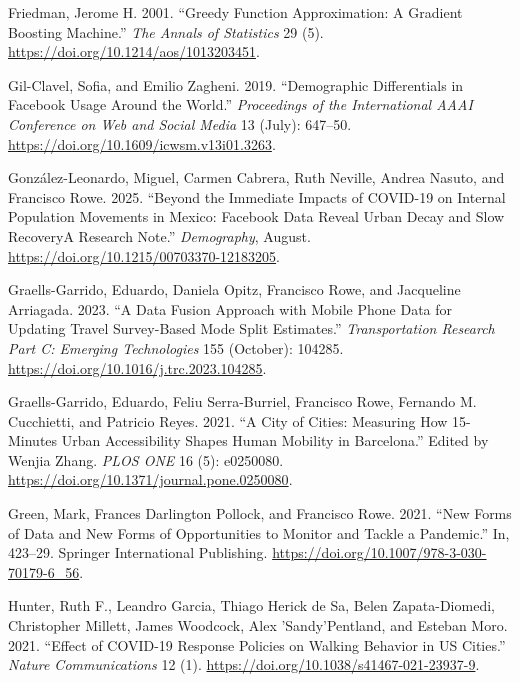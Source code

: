 \documentclass{article}
\newlength{\cslhangindent}
\newenvironment{CSLReferences}[2] %
 {\begin{list}{}{%
  \setlength{\itemindent}{0pt}
  \setlength{\leftmargin}{0pt}
  \setlength{\parsep}{0pt}
  \ifodd #1
   \setlength{\leftmargin}{\cslhangindent}
   \setlength{\itemindent}{-1\cslhangindent}
  \fi
  \setlength{\itemsep}{#2\baselineskip}}}
 {\end{list}}
\begin{document}
\begin{CSLReferences}{1}{0}
Friedman, Jerome H. 2001. {``Greedy Function Approximation: A Gradient Boosting Machine.''} \emph{The Annals of Statistics} 29 (5). \url{https://doi.org/10.1214/aos/1013203451}.

Gil-Clavel, Sofia, and Emilio Zagheni. 2019. {``Demographic Differentials in Facebook Usage Around the World.''} \emph{Proceedings of the International AAAI Conference on Web and Social Media} 13 (July): 647--50. \url{https://doi.org/10.1609/icwsm.v13i01.3263}.

González-Leonardo, Miguel, Carmen Cabrera, Ruth Neville, Andrea Nasuto, and Francisco Rowe. 2025. {``Beyond the Immediate Impacts of COVID-19 on Internal Population Movements in Mexico: Facebook Data Reveal Urban Decay and Slow Recovery{\textemdash}A Research Note.''} \emph{Demography}, August. \url{https://doi.org/10.1215/00703370-12183205}.

Graells-Garrido, Eduardo, Daniela Opitz, Francisco Rowe, and Jacqueline Arriagada. 2023. {``A Data Fusion Approach with Mobile Phone Data for Updating Travel Survey-Based Mode Split Estimates.''} \emph{Transportation Research Part C: Emerging Technologies} 155 (October): 104285. \url{https://doi.org/10.1016/j.trc.2023.104285}.

Graells-Garrido, Eduardo, Feliu Serra-Burriel, Francisco Rowe, Fernando M. Cucchietti, and Patricio Reyes. 2021. {``A City of Cities: Measuring How 15-Minutes Urban Accessibility Shapes Human Mobility in Barcelona.''} Edited by Wenjia Zhang. \emph{PLOS ONE} 16 (5): e0250080. \url{https://doi.org/10.1371/journal.pone.0250080}.

Green, Mark, Frances Darlington Pollock, and Francisco Rowe. 2021. {``New Forms of Data and New Forms of Opportunities to Monitor and Tackle a Pandemic.''} In, 423--29. Springer International Publishing. \url{https://doi.org/10.1007/978-3-030-70179-6_56}.

Hunter, Ruth F., Leandro Garcia, Thiago Herick de Sa, Belen Zapata-Diomedi, Christopher Millett, James Woodcock, Alex 'Sandy'Pentland, and Esteban Moro. 2021. {``Effect of COVID-19 Response Policies on Walking Behavior in US Cities.''} \emph{Nature Communications} 12 (1). \url{https://doi.org/10.1038/s41467-021-23937-9}.


\end{CSLReferences}
\end{document}
